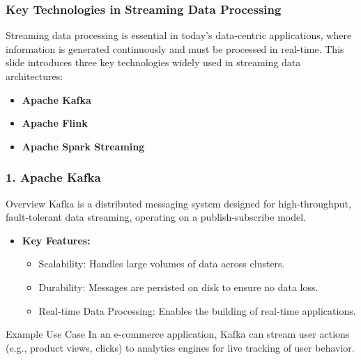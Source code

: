 \documentclass[aspectratio=169]{beamer}
\begin{document}
\begin{frame}[fragile]
    \frametitle{Key Technologies in Streaming Data Processing}
    Streaming data processing is essential in today's data-centric applications, where information is generated continuously and must be processed in real-time. This slide introduces three key technologies widely used in streaming data architectures: 
    \begin{itemize}
        \item \textbf{Apache Kafka}
        \item \textbf{Apache Flink}
        \item \textbf{Apache Spark Streaming}
    \end{itemize}
\end{frame}

\begin{frame}[fragile]
    \frametitle{1. Apache Kafka}
    \begin{block}{Overview}
        Kafka is a distributed messaging system designed for high-throughput, fault-tolerant data streaming, operating on a publish-subscribe model.
    \end{block}
    
    \begin{itemize}
        \item \textbf{Key Features:}
        \begin{itemize}
            \item Scalability: Handles large volumes of data across clusters.
            \item Durability: Messages are persisted on disk to ensure no data loss.
            \item Real-time Data Processing: Enables the building of real-time applications.
        \end{itemize}
    \end{itemize}

    \begin{block}{Example Use Case}
        In an e-commerce application, Kafka can stream user actions (e.g., product views, clicks) to analytics engines for live tracking of user behavior.
    \end{block}
\end{frame}
\end{document}
